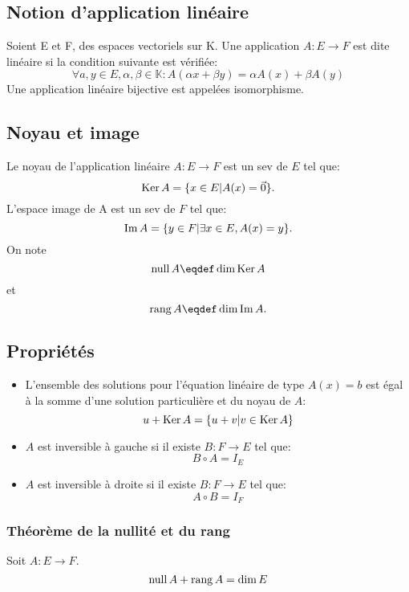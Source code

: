 \subsection{Notion d'application linéaire}
Soient E et F, des espaces vectoriels sur K.
Une application $A : E \rightarrow F$ est dite linéaire
si la condition suivante est vérifiée:
\[ \forall a,y \in E, \alpha, \beta \in\mathbb{K} :
A(\alpha{x} + \beta{y}) = \alpha{A(x)} + \beta{A(y)} \]
Une application linéaire bijective est appelées isomorphisme.

\subsection{Noyau et image}
Le noyau de l'application linéaire
$A: E \rightarrow F$ est un sev de $E$ tel que:
\[ \operatorname{Ker} A = \{x \in E| A(x) = \vec{0}\}. \]
L'espace image de A est un sev de $F$ tel que:
\[ \operatorname{Im} A = \{y \in F | \exists x \in E, A(x) = y\}. \]
On note
\[ \newnull A \eqdef \dim \newker A \]
et
\[ \newrang A \eqdef \dim \newim A. \]

\subsection{Propriétés}
\begin{itemize}
  \item L'ensemble des solutions pour l'équation linéaire de type $A(x) = b$
    est égal à la somme d'une solution particulière et du noyau de $A$:
    \[ u + \operatorname{Ker} A = \{u + v | v \in \operatorname{Ker} A\} \]
  \item $A$ est inversible à gauche si il existe $B : F \rightarrow E$ tel que:
    \[ B\circ A = I_E \]
  \item $A$ est inversible à droite si il existe $B : F \rightarrow E$ tel que:
    \[ A\circ B = I_F \]
\end{itemize}

\subsubsection{Théorème de la nullité et du rang}
Soit $A : E \rightarrow F$.
\[ \operatorname{null} A + \operatorname{rang} A = \dim E \]

